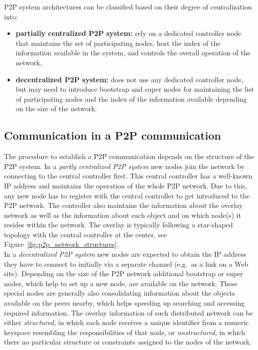 \gls{P2P} system architectures can be classified based on their degree of centralization into: \@

\begin{itemize}
	\item \textbf{partially centralized \gls{P2P} system:} rely on a dedicated controller node that maintains the set of participating nodes, host the index of the information available in the system, and controls the overall operation of the network,
	\item \textbf{decentralized \gls{P2P} system:} does not use any dedicated controller node, but may need to introduce bootstrap and super nodes for maintaining the list of participating nodes and the index of the information available depending on the size of the network.
\end{itemize}


\subsection{Communication in a \gls{P2P} communication}
\label{sec:p2p_start_communication}

The procedure to establish a \gls{P2P} communication depends on the structure of the \gls{P2P} system. In a \emph{partly centralized \gls{P2P} system} new nodes join the network by connecting to the central controller first. This central controller has a well-known \gls{IP} address and maintains the operation of the whole \gls{P2P} network. Due to this, any new node has to register with the central controller to get introduced to the \gls{P2P} network. The controller also maintains the information about the overlay network as well as the information about each object and on which node(s) it resides within the network. The overlay is typically following a star-shaped topology with the central controller at the center, see Figure~\ref{fig:p2p_network_structures}. \\

In a \emph{decentralized \gls{P2P} system} new nodes are expected to obtain the \gls{IP} address they have to connect to initially via a separate channel (e.g.\ as a link on a Web site). Depending on the size of the \gls{P2P} network additional bootstrap or super nodes, which help to set up a new node, are available on the network. These special nodes are generally also consolidating information about the objects available on the peers nearby, which helps speeding up searching and accessing required information. The overlay information of such distributed network can be either \emph{structured}, in which each node receives a unique identifier from a numeric keyspace resembling the responsibilities of that node, or \emph{unstructured}, in which there no particular structure or constraints assigned to the nodes of the network. \\

